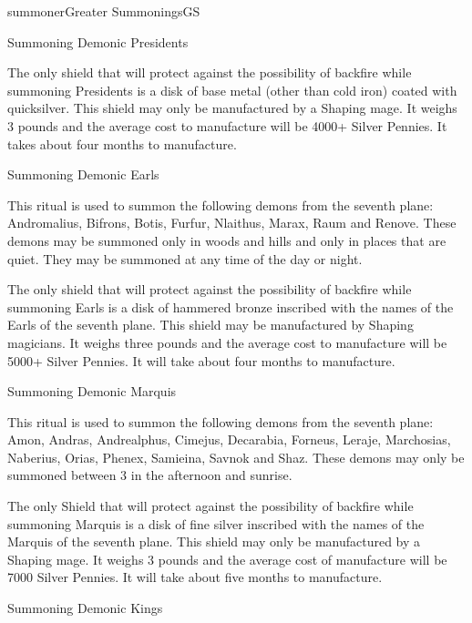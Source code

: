 \begin{college}[1.0]{summoner}{Greater Summonings}{GS}
\begin{ritual}[R-3]{Summoning Demonic Presidents}
\begin{effects}
The only shield that will protect against the possibility of backfire
while summoning Presidents is a disk of base metal (other than cold
iron) coated with quicksilver.  This shield may only be manufactured
by a Shaping mage.  It weighs 3 pounds and the average cost to
manufacture will be 4000+ Silver Pennies.  It takes about four months
to manufacture.
\end{effects}
\end{ritual}

\begin{ritual}[R-4]{Summoning Demonic Earls}

\begin{effects}
This ritual is used to summon the following demons from the seventh
plane: Andromalius, Bifrons, Botis, Furfur, Nlaithus, Marax, Raum and
Renove.  These demons may be summoned only in woods and hills and only
in places that are quiet.  They may be summoned at any time of the day
or night.

The only shield that will protect against the possibility of backfire
while summoning Earls is a disk of hammered bronze inscribed with
the names of the Earls of the seventh plane.  This shield may be
manufactured by Shaping magicians.  It weighs three pounds and the
average cost to manufacture will be 5000+ Silver Pennies.  It will
take about four months to manufacture.
\end{effects}
\end{ritual}

\begin{ritual}[R-5]{Summoning Demonic Marquis}

\begin{effects}
This ritual is used to summon the following demons from the seventh
plane: Amon, Andras, Andrealphus, Cimejus, Decarabia, Forneus, Leraje,
Marchosias, Naberius, Orias, Phenex, Samieina, Savnok and Shaz.  These
demons may only be summoned between 3 in the afternoon and sunrise.

The only Shield that will protect against the possibility of backfire
while summoning Marquis is a disk of fine silver inscribed with the
names of the Marquis of the seventh plane.  This shield may only be
manufactured by a Shaping mage.  It weighs 3 pounds and the average
cost of manufacture will be 7000 Silver Pennies.  It will take about
five months to manufacture.
\end{effects}
\end{ritual}

\begin{ritual}[R-6]{Summoning Demonic Kings}


\end{ritual}
\end{college}
